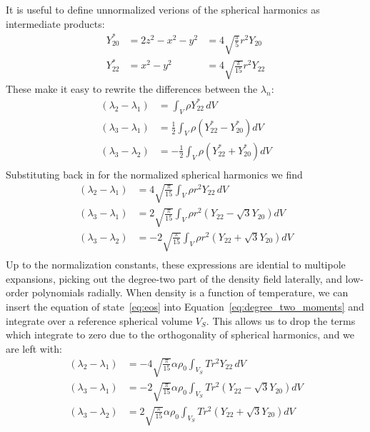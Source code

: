 \documentclass[extra,mreferee]{gji}
\begin{document}
It is useful to define unnormalized verions of the spherical harmonics as intermediate products:
\begin{equation}
\begin{aligned}
Y_{20}^* &= 2 z^2 - x^2 - y^2 &= 4 \sqrt{ \frac{\pi}{5} } r^2 Y_{20} \\ 
Y_{22}^* &= x^2 - y^2 &= 4 \sqrt{ \frac{\pi}{15} } r^2 Y_{22}
\end{aligned}
\end{equation}
These make it easy to rewrite the differences between the $\lambda_n$:
\begin{equation}
\begin{aligned}
(\lambda_2 - \lambda_1) &= \int_V \rho Y_{22}^* \, dV \\
(\lambda_3 - \lambda_1) &= \frac{1}{2} \int_V  \rho \left( Y_{22}^* - Y_{20}^* \right) dV \\
(\lambda_3 - \lambda_2) &= -\frac{1}{2} \int_V \rho \left( Y_{22}^* + Y_{20}^*  \right) dV \\
\end{aligned}
\end{equation}
Substituting back in for the normalized spherical harmonics we find
\fi
\begin{equation}
\begin{aligned}
(\lambda_2 - \lambda_1) &= 4 \sqrt{\frac{\pi}{15} } \int_V   \rho r^2  Y_{22} \,dV \\
(\lambda_3 - \lambda_1) &= 2 \sqrt{ \frac{\pi}{15} } \int_V  \rho r^2 \left( Y_{22} - \sqrt{3} Y_{20} \right) dV \\
(\lambda_3 - \lambda_2) &= -2 \sqrt{ \frac{\pi}{15} } \int_V  \rho r^2 \left( Y_{22} + \sqrt{3} Y_{20} \right) dV \\
\label{eq:degree_two_moments}
\end{aligned}
\end{equation}
Up to the normalization constants, these expressions are idential to multipole expansions, 
picking out the degree-two part of the density field laterally, and low-order polynomials radially.
When density is a function of temperature, we can insert the equation of state~\eqref{eq:eos} into 
Equation~\eqref{eq:degree_two_moments} and integrate over a reference spherical volume $V_S$.
This allows us to drop the terms which integrate to zero due to the orthogonality of spherical harmonics, and we are left with:
\begin{equation}
\begin{aligned}
(\lambda_2 - \lambda_1) &= -4 \sqrt{\frac{\pi}{15} } \alpha \rho_0 \int_{V_S} T r^2  Y_{22} \,dV \\
(\lambda_3 - \lambda_1) &= -2 \sqrt{ \frac{\pi}{15} } \alpha \rho_0 \int_{V_S} T r^2 \left( Y_{22} - \sqrt{3} Y_{20} \right) dV \\
(\lambda_3 - \lambda_2) &= 2 \sqrt{ \frac{\pi}{15} } \alpha \rho_0 \int_{V_S}  T r^2 \left( Y_{22} + \sqrt{3} Y_{20} \right) dV \\
\label{eq:degree_two_moments_of_temperature}
\end{aligned}
\end{equation}
\end{document}
